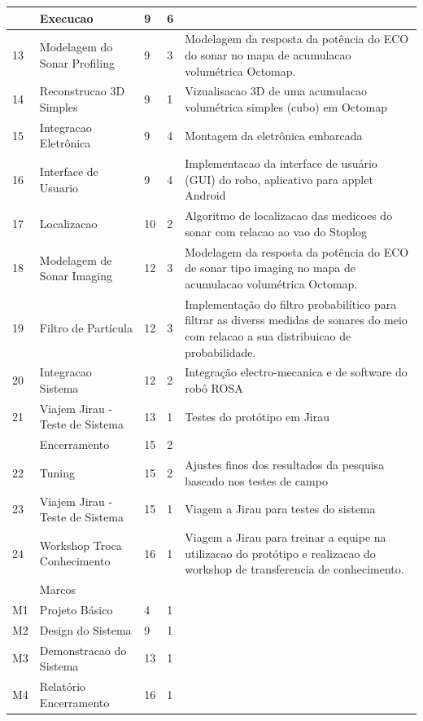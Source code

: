 \begin{longtable}{ | l | p{4cm} | l | l | p{5cm} | }
	\rowcolor{Gray}
	   & Execucao & 9 & 6 &  \\ \hline
	13 & Modelagem do Sonar Profiling & 9 & 3 & Modelagem da resposta da potência
	do ECO do sonar no mapa de acumulacao volumétrica Octomap.  \\ \hline 
	14 & Reconstrucao 3D Simples & 9 & 1 & Vizualisacao 3D de uma acumulacao
	volumétrica simples (cubo)  em Octomap  \\ \hline 
	15 & Integracao Eletrônica & 9 & 4 & Montagem da eletrônica
	embarcada \\ \hline 
	16 & Interface de Usuario & 9 & 4 & Implementacao da interface de
	usuário (GUI) do robo, aplicativo para applet Android \\ \hline 
	17 & Localizacao & 10 & 2 & Algoritmo de localizacao das medicoes do
	sonar com relacao ao vao do Stoplog \\ \hline 
	18 & Modelagem de Sonar Imaging & 12 & 3 & Modelagem da resposta da
	potência do ECO de sonar tipo imaging no mapa de acumulacao volumétrica Octomap. \\ \hline 
	19 & Filtro de Partícula & 12 & 3 & Implementação do filtro
	probabilítico  para filtrar as diverss medidas de sonares do meio com relacao a sua distribuicao de probabilidade. \\ \hline 
	20 & Integracao Sistema & 12 & 2 & Integração electro-mecanica e de
	 software do robô ROSA \\ \hline 
	21 & Viajem Jirau - Teste de Sistema & 13 & 1 & Testes do protótipo em
	Jirau \\ \hline
	\rowcolor{Gray}
	 & Encerramento & 15 & 2 & \  \\ \hline
	22 & Tuning & 15 & 2 & Ajustes finos dos resultados da pesquisa
	baseado nos testes de campo \\ \hline 
	23 & Viajem Jirau - Teste de Sistema & 15 & 1 & Viagem a Jirau para testes
	do sistema \\ \hline 
	24 & Workshop Troca Conhecimento & 16 & 1 & Viagem a Jirau para treinar a
	equipe na utilizacao do protótipo e realizacao do workshop de transferencia de conhecimento.  \\ \hline 
	\rowcolor{Gray}
	   & Marcos &  &  &  \  \\ \hline
	M1 & Projeto Básico & 4 & 1 &  \  \\ \hline
	M2 & Design do Sistema & 9 & 1 & \  \\ \hline
	M3 & Demonstracao do Sistema & 13 & 1   & \  \\ \hline
	M4 & Relatório \newline Encerramento & 16 & 1   & \  \\ \hline
\end{longtable}



